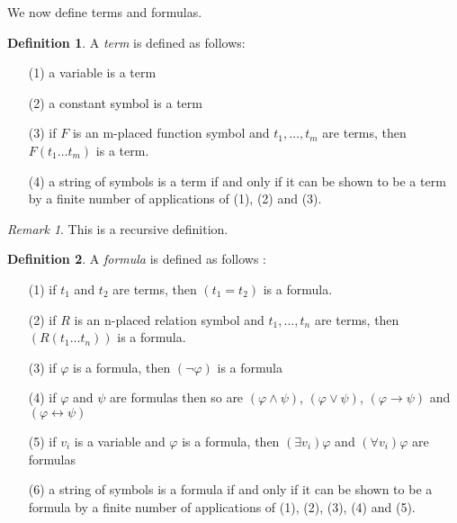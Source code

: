 \documentclass[titlepage, oneside]{amsbook}
\theoremstyle{plain}
\theoremstyle{definition}
\newtheorem{definition}{Definition}
\theoremstyle{remark}
\newtheorem*{note}{Remark}
\begin{document}
    We now define terms and formulas.

\begin{definition}\label{D:term}
%
   A \emph{term} is defined as follows:
\begin{itemize}
\item [(1)] a variable is a term
\item[(2)] a constant symbol is a term
\item[(3)] if $F$ is an m-placed function symbol and
$t_{1},\dots,t_{m}$  are terms, then \\
 $F(t_{1} \dots t_{m})$ is a term.
\item[(4)] a string of symbols is a term if and only if it can be shown 
to be a term by a finite number of applications of (1), (2) and (3).

\end{itemize}
\end{definition}
\begin{note} This is a recursive definition.
\end{note}

\begin{definition}
%
   A  \emph{formula} is defined as follows :

\begin{itemize}
\item[(1)] if $t_1$ and $t_2$ are terms, then $(t_1 = t_2 )$ is a
formula.
\item[(2)] if $R$ is an n-placed relation symbol and 
$t_1 , \dots , t_n$ are terms, then  \\
$(R( t_1 \dots t_n))$ is a formula.
\item[(3)] if $\varphi$ is a formula, then $( \neg \varphi )$ is a
formula
\item[(4)] if $\varphi$ and $\psi$ are formulas then so are $( \varphi
\wedge \psi )$, $ ( \varphi \vee \psi )$, $( \varphi \to \psi )$ and
 $ ( \varphi \leftrightarrow \psi )$
\item[(5)] if $v_{i}$ is a variable and $\varphi$ is a formula, then 
$( \exists v_{i}) \varphi$ and $( \forall v_{i}) \varphi$ are formulas
\item[(6)] a string of symbols is a formula if and only if it can be
shown
to be a formula by a finite number of applications of (1), (2), (3),
(4) and (5).


\end{itemize}
\end{definition}
\end{document}
